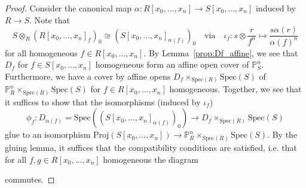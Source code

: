 \documentclass{scrartcl}
\renewcommand{\P}{\mathbb{P}}
\newcommand{\Spec}{\mathrm{Spec}}
\newcommand{\Proj}{\mathrm{Proj}}
\theoremstyle{definition}
\begin{document}
\begin{proof}
    Consider the canonical map $\alpha: R[x_0, ..., x_n] \to S[x_0, ..., x_n]$ induced by $R \to S$.
    Note that
    \begin{equation*}
        S \otimes_R (R[x_0, ..., x_n]_f)_0 \cong (S[x_0, ..., x_n]_{\alpha(f)})_0 \quad \text{via} \quad \iota_f: s \otimes \frac r {f^n} \mapsto \frac {s\alpha(r)} {\alpha(f)^n}
    \end{equation*}
    for all homogeneous $f \in R[x_0, ..., x_n]$.
    By Lemma~\ref{prop:Df_affine}, we see that $D_f$ for $f \in S[x_0, ..., x_n]$ homogeneous form an affine open cover of $\P_S^n$.
    Furthermore, we have a cover by affine opens $D_f \times_{\Spec(R)} \Spec(S)$ of $\P_R^n \times_{\Spec(R)} \Spec(S)$ for $f \in R[x_0, ..., x_n]$ homogeneous.
    Together, we see that it suffices to show that the isomorphisms (induced by $\iota_f$)
    \begin{equation*}
        \phi_f: D_{\alpha(f)} = \Spec((S[x_0, ..., x_n]_{\alpha(f)})_0) \to D_f \times_{\Spec(R)} \Spec(S)
    \end{equation*}
    glue to an isomorphism $\Proj(S[x_0, ..., x_n]) \to \P_R^n \times_{\Spec(R)} \Spec(S)$.
    By the gluing lemma, it suffices that the compatibility conditions are satisfied, i.e. that for all $f, g \in R[x_0, ..., x_n]$ homogeneous the diagram
    \begin{center}
    \end{center}
    commutes.


\end{proof}
\end{document}
